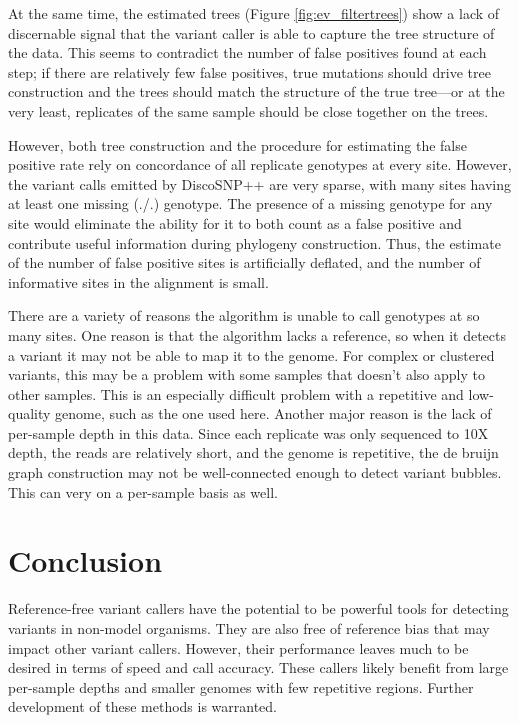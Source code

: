 At the same time, the estimated trees (Figure \ref{fig:ev_filtertrees}) show a lack of discernable signal that the variant caller is able to capture the tree structure of the data. This seems to contradict the number of false positives found at each step; if there are relatively few false positives, true mutations should drive tree construction and the trees should match the structure of the true tree---or at the very least, replicates of the same sample should be close together on the trees.

However, both tree construction and the procedure for estimating the false positive rate rely on concordance of all replicate genotypes at every site. However, the variant calls emitted by DiscoSNP++ are very sparse, with many sites having at least one missing (./.) genotype. The presence of a missing genotype for any site would eliminate the ability for it to both count as a false positive and contribute useful information during phylogeny construction. Thus, the estimate of the number of false positive sites is artificially deflated, and the number of informative sites in the alignment is small. 


There are a variety of reasons the algorithm is unable to call genotypes at so many sites. One reason is that the algorithm lacks a reference, so when it detects a variant it may not be able to map it to the genome. For complex or clustered variants, this may be a problem with some samples that doesn't also apply to other samples. This is an especially difficult problem with a repetitive and low-quality genome, such as the one used here. Another major reason is the lack of per-sample depth in this data. Since each replicate was only sequenced to 10X depth, the reads are relatively short, and the genome is repetitive, the de bruijn graph construction may not be well-connected enough to detect variant bubbles. This can very on a per-sample basis as well.


\section{Conclusion}

Reference-free variant callers have the potential to be powerful tools for detecting variants in non-model organisms. They are also free of reference bias that may impact other variant callers. However, their performance leaves much to be desired in terms of speed and call accuracy. These callers likely benefit from large per-sample depths and smaller genomes with few repetitive regions. Further development of these methods is warranted.

\printbibliography
